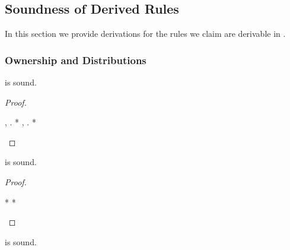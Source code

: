 \subsection{Soundness of Derived Rules}
\label{sec:appendix:derived-rules}


In this section we provide derivations for the rules we claim
are derivable in \thelogic.


\subsubsection{Ownership and Distributions}
\begin{lemma}
\label{proof:sure-dirac}
   is sound.
\end{lemma}

\begin{proof}
  \begin{eqexplain}
\whichisequiv*
    \E \m{\sigmaF}, \m{\prob}.
      \Own{(\m{\sigmaF}, \m{\prob})}
      *
\whichisequiv
    \E \m{\sigmaF}, \m{\prob}.
      \Own{(\m{\sigmaF}, \m{\prob})}
      *
\whichisequiv
\qedhere
  \end{eqexplain}
\end{proof} \begin{lemma}
\label{proof:sure-eq-inj}
   is sound.
\end{lemma}

\begin{proof}
\begin{eqexplain}
  *
\whichproves*
  *
\whichproves
  \land
\whichproves
\whichproves
\qedhere
\end{eqexplain}
\end{proof} \begin{lemma}
\label{proof:sure-sub}
   is sound.
\end{lemma}

